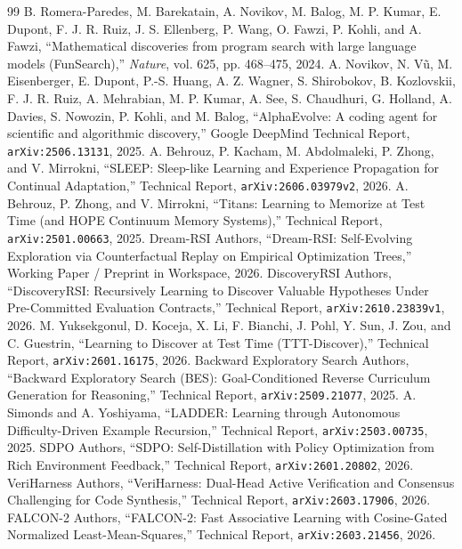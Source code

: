 \documentclass[11pt,a4paper]{article}
\begin{document}
\begin{thebibliography}{99}
 B. Romera-Paredes, M. Barekatain, A. Novikov, M. Balog, M. P. Kumar, E. Dupont, F. J. R. Ruiz, J. S. Ellenberg, P. Wang, O. Fawzi, P. Kohli, and A. Fawzi, ``Mathematical discoveries from program search with large language models (FunSearch),'' \emph{Nature}, vol. 625, pp. 468--475, 2024.
 A. Novikov, N. V\~{u}, M. Eisenberger, E. Dupont, P.-S. Huang, A. Z. Wagner, S. Shirobokov, B. Kozlovskii, F. J. R. Ruiz, A. Mehrabian, M. P. Kumar, A. See, S. Chaudhuri, G. Holland, A. Davies, S. Nowozin, P. Kohli, and M. Balog, ``AlphaEvolve: A coding agent for scientific and algorithmic discovery,'' Google DeepMind Technical Report, \texttt{arXiv:2506.13131}, 2025.
 A. Behrouz, P. Kacham, M. Abdolmaleki, P. Zhong, and V. Mirrokni, ``SLEEP: Sleep-like Learning and Experience Propagation for Continual Adaptation,'' Technical Report, \texttt{arXiv:2606.03979v2}, 2026.
 A. Behrouz, P. Zhong, and V. Mirrokni, ``Titans: Learning to Memorize at Test Time (and HOPE Continuum Memory Systems),'' Technical Report, \texttt{arXiv:2501.00663}, 2025.
 Dream-RSI Authors, ``Dream-RSI: Self-Evolving Exploration via Counterfactual Replay on Empirical Optimization Trees,'' Working Paper / Preprint in Workspace, 2026.
 DiscoveryRSI Authors, ``DiscoveryRSI: Recursively Learning to Discover Valuable Hypotheses Under Pre-Committed Evaluation Contracts,'' Technical Report, \texttt{arXiv:2610.23839v1}, 2026.
 M. Yuksekgonul, D. Koceja, X. Li, F. Bianchi, J. Pohl, Y. Sun, J. Zou, and C. Guestrin, ``Learning to Discover at Test Time (TTT-Discover),'' Technical Report, \texttt{arXiv:2601.16175}, 2026.
 Backward Exploratory Search Authors, ``Backward Exploratory Search (BES): Goal-Conditioned Reverse Curriculum Generation for Reasoning,'' Technical Report, \texttt{arXiv:2509.21077}, 2025.
 A. Simonds and A. Yoshiyama, ``LADDER: Learning through Autonomous Difficulty-Driven Example Recursion,'' Technical Report, \texttt{arXiv:2503.00735}, 2025.
 SDPO Authors, ``SDPO: Self-Distillation with Policy Optimization from Rich Environment Feedback,'' Technical Report, \texttt{arXiv:2601.20802}, 2026.
 VeriHarness Authors, ``VeriHarness: Dual-Head Active Verification and Consensus Challenging for Code Synthesis,'' Technical Report, \texttt{arXiv:2603.17906}, 2026.
 FALCON-2 Authors, ``FALCON-2: Fast Associative Learning with Cosine-Gated Normalized Least-Mean-Squares,'' Technical Report, \texttt{arXiv:2603.21456}, 2026.

\end{thebibliography}
\end{document}
